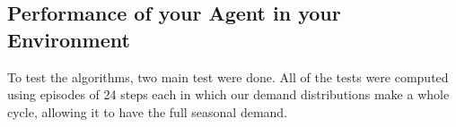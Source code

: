 \documentclass[journal, a4paper]{IEEEtran}
\theoremstyle{plain}
\theoremstyle{definition}
\begin{document}
\subsection{Performance of your Agent in your Environment}
To test the algorithms, two main test were done. All of the tests were computed using episodes of 24 steps each in which our demand distributions make a whole cycle, allowing it to have the full seasonal demand.\newline
\end{document}
